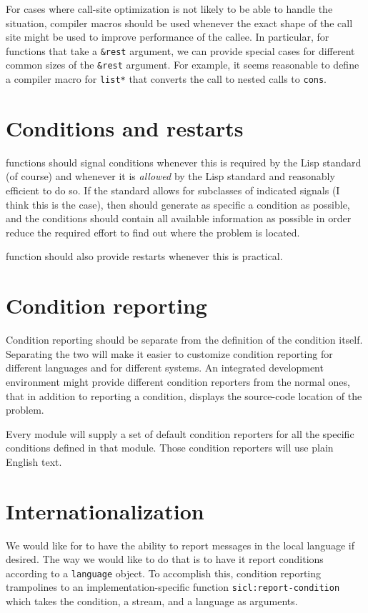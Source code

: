 For cases where call-site optimization is not likely to be able to
handle the situation, compiler macros should be used whenever the
exact shape of the call site might be used to improve performance of
the callee. In particular, for functions that take a \texttt{\&rest}
argument, we can provide special cases for different common sizes of
the \texttt{\&rest} argument.  For example, it seems reasonable to
define a compiler macro for \texttt{list*} that converts the call to
nested calls to \texttt{cons}.

\section{Conditions and restarts}

\sysname{} functions should signal conditions whenever this is
required by the Lisp standard (of course) and whenever it is
\emph{allowed} by the Lisp standard and reasonably efficient to do so.
If the standard allows for subclasses of indicated signals (I think
this is the case), then \sysname{} should generate as specific a
condition as possible, and the conditions should contain all available
information as possible in order reduce the required effort to
find out where the problem is located.

\sysname{} function should also provide restarts whenever this is
practical.

\section{Condition reporting}

Condition reporting should be separate from the definition of the
condition itself.  Separating the two will make it easier to customize
condition reporting for different languages and for different
systems.  An integrated development environment might provide
different condition reporters from the normal ones, that in addition
to reporting a condition, displays the source-code location of the
problem.

Every \sysname{} module will supply a set of default condition
reporters for all the specific conditions defined in that module.
Those condition reporters will use plain English text.

\section{Internationalization}

We would like for {\sysname} to have the ability to report messages in
the local language if desired.  The way we would like to do that is to
have it report conditions according to a \texttt{language} object.  To
accomplish this, condition reporting trampolines to an
implementation-specific function \texttt{sicl:report-condition} which
takes the condition, a stream, and a language as arguments.


